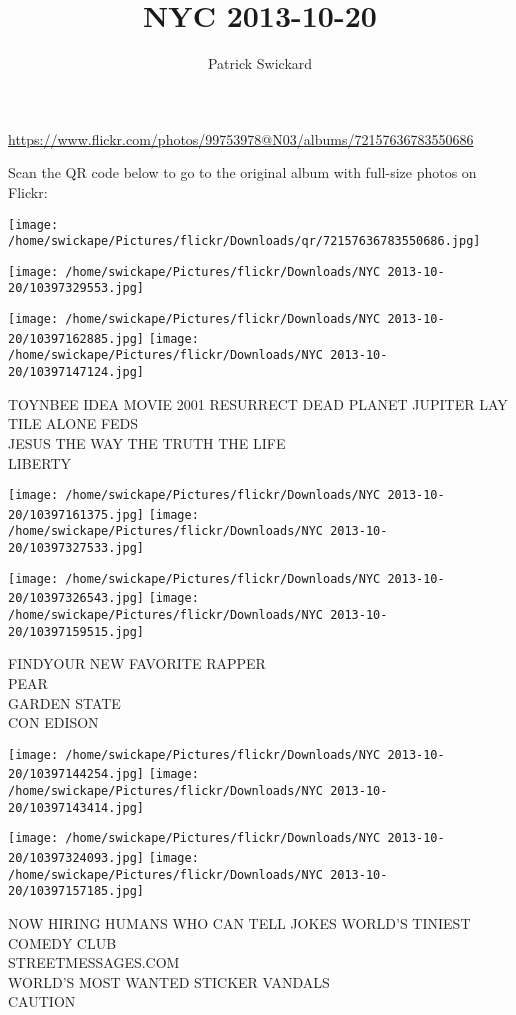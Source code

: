 \documentclass[10pt,letterpaper]{article}
\title{NYC 2013-10-20}
\author{Patrick Swickard}
\date{}
\begin{document}
\maketitle

\url{https://www.flickr.com/photos/99753978@N03/albums/72157636783550686}

Scan the QR code below to go to the original album with full-size photos on Flickr:

\texttt{[image: /home/swickape/Pictures/flickr/Downloads/qr/72157636783550686.jpg]}
\pagebreak

\texttt{[image: /home/swickape/Pictures/flickr/Downloads/NYC 2013-10-20/10397329553.jpg]}

\vspace{0.25in}
\texttt{[image: /home/swickape/Pictures/flickr/Downloads/NYC 2013-10-20/10397162885.jpg]}
\texttt{[image: /home/swickape/Pictures/flickr/Downloads/NYC 2013-10-20/10397147124.jpg]}

TOYNBEE IDEA MOVIE 2001 RESURRECT DEAD PLANET JUPITER LAY TILE ALONE FEDS\\
JESUS THE WAY THE TRUTH THE LIFE\\
LIBERTY
\pagebreak

\texttt{[image: /home/swickape/Pictures/flickr/Downloads/NYC 2013-10-20/10397161375.jpg]}
\texttt{[image: /home/swickape/Pictures/flickr/Downloads/NYC 2013-10-20/10397327533.jpg]}

\texttt{[image: /home/swickape/Pictures/flickr/Downloads/NYC 2013-10-20/10397326543.jpg]}
\texttt{[image: /home/swickape/Pictures/flickr/Downloads/NYC 2013-10-20/10397159515.jpg]}

FINDYOUR NEW FAVORITE RAPPER\\
PEAR\\
GARDEN STATE\\
CON EDISON
\pagebreak

\texttt{[image: /home/swickape/Pictures/flickr/Downloads/NYC 2013-10-20/10397144254.jpg]}
\texttt{[image: /home/swickape/Pictures/flickr/Downloads/NYC 2013-10-20/10397143414.jpg]}

\texttt{[image: /home/swickape/Pictures/flickr/Downloads/NYC 2013-10-20/10397324093.jpg]}
\texttt{[image: /home/swickape/Pictures/flickr/Downloads/NYC 2013-10-20/10397157185.jpg]}

NOW HIRING HUMANS WHO CAN TELL JOKES WORLD'S TINIEST COMEDY CLUB\\
STREETMESSAGES.COM\\
WORLD'S MOST WANTED STICKER VANDALS\\
CAUTION
\pagebreak
\end{document}
